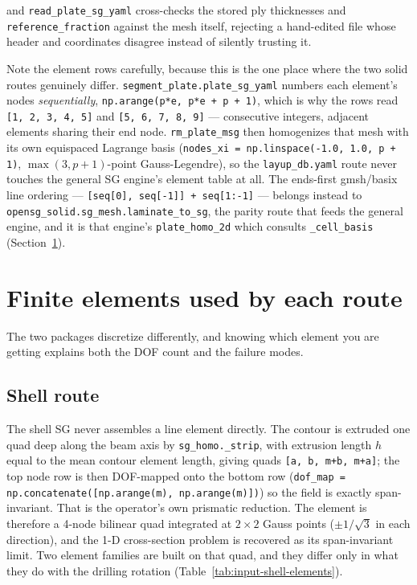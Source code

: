 and \texttt{read\_plate\_sg\_yaml} cross-checks the stored ply thicknesses and
\texttt{reference\_fraction} against the mesh itself, rejecting a hand-edited
file whose header and coordinates disagree instead of silently trusting it.

Note the element rows carefully, because this is the one place where the two
solid routes genuinely differ. \texttt{segment\_plate.plate\_sg\_yaml} numbers
each element's nodes \emph{sequentially}, \texttt{np.arange(p*e, p*e + p + 1)},
which is why the rows read \texttt{[1, 2, 3, 4, 5]} and \texttt{[5, 6, 7, 8, 9]}
--- consecutive integers, adjacent elements sharing their end node.
\texttt{rm\_plate\_msg} then homogenizes that mesh with its own equispaced
Lagrange basis (\texttt{nodes\_xi = np.linspace(-1.0, 1.0, p + 1)},
$\max(3, p+1)$-point Gauss-Legendre), so the \texttt{layup\_db.yaml} route never
touches the general SG engine's element table at all. The ends-first
gmsh/basix line ordering --- \texttt{[seq[0], seq[-1]] + seq[1:-1]} --- belongs
instead to \texttt{opensg\_solid.sg\_mesh.laminate\_to\_sg}, the parity route
that feeds the general engine, and it is that engine's
\texttt{plate\_homo\_2d} which consults \texttt{\_cell\_basis}
(Section~\ref{sec:input-elements}).

\section{Finite elements used by each route}
\label{sec:input-elements}

The two packages discretize differently, and knowing which element you are
getting explains both the DOF count and the failure modes.

\subsection{Shell route}

The shell SG never assembles a line element directly. The contour is extruded one
quad deep along the beam axis by \texttt{sg\_homo.\_strip}, with extrusion length
$h$ equal to the mean contour element length, giving quads
\texttt{[a, b, m+b, m+a]}; the top node row is then DOF-mapped onto the bottom
row (\texttt{dof\_map = np.concatenate([np.arange(m), np.arange(m)])}) so the
field is exactly span-invariant. That is the operator's own prismatic reduction.
The element is therefore a 4-node bilinear quad integrated at $2\times2$ Gauss
points ($\pm 1/\sqrt{3}$ in each direction), and the 1-D cross-section problem is
recovered as its span-invariant limit. Two element families are built on that
quad, and they differ only in what they do with the drilling rotation
(Table~\ref{tab:input-shell-elements}).

